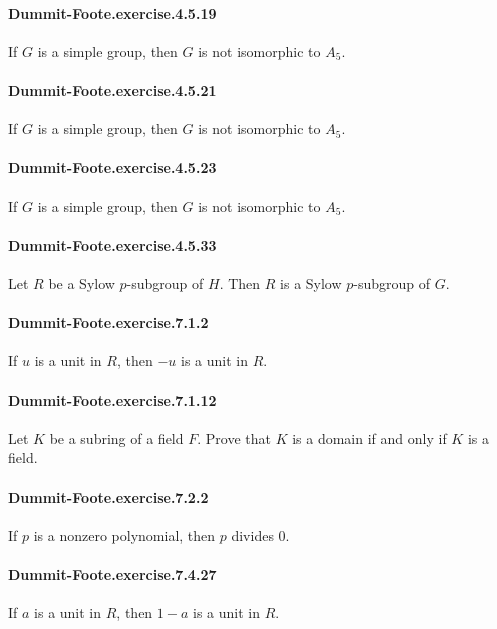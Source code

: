 \documentclass{article}
\begin{document}
\paragraph{Dummit-Foote.exercise.4.5.19} If $G$ is a simple group, then $G$ is not isomorphic to $A_5$.

\paragraph{Dummit-Foote.exercise.4.5.21} If $G$ is a simple group, then $G$ is not isomorphic to $A_5$.

\paragraph{Dummit-Foote.exercise.4.5.23} If $G$ is a simple group, then $G$ is not isomorphic to $A_5$.

\paragraph{Dummit-Foote.exercise.4.5.33} Let $R$ be a Sylow $p$-subgroup of $H$. Then $R$ is a Sylow $p$-subgroup of $G$.

\paragraph{Dummit-Foote.exercise.7.1.2} If $u$ is a unit in $R$, then $-u$ is a unit in $R$. 

\paragraph{Dummit-Foote.exercise.7.1.12} Let $K$ be a subring of a field $F$. Prove that $K$ is a domain if and only if $K$ is a field.

\paragraph{Dummit-Foote.exercise.7.2.2} If $p$ is a nonzero polynomial, then $p$ divides $0$.


\paragraph{Dummit-Foote.exercise.7.4.27} If $a$ is a unit in $R$, then $1-a$ is a unit in $R$.
\end{document}
